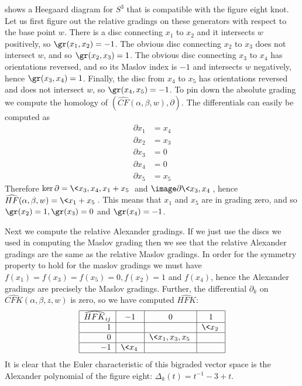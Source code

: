 \begin{example}
 shows a Heegaard diagram for $S^3$ that is compatible with the figure eight knot. Let us first figure out the relative gradings on these generators with respect to the base point $w$. There is a disc connecting $x_1$ to $x_2$ and it intersects $w$ positively, so $\gr(x_1,x_2)=-1$. The obvious disc connecting $x_2$ to $x_3$ does not intersect $w$, and so $\gr(x_2,x_3) = 1$. The obvious disc connecting $x_3$ to $x_4$ has orientations reversed, and so its Maslov index is $-1$ and intersects $w$ negatively, hence $\gr(x_3,x_4) = 1$. Finally, the disc from $x_4$ to $x_5$ has orientations reversed and does not intersect $w$, so $\gr(x_4,x_5)=-1$. To pin down the absolute grading we compute the homology of $(\widehat{CF}(\alpha,\beta,w),\partial)$. The differentials can easily be computed as
\begin{align*}
	\partial x_1 &= x_4 \\
	\partial x_2 &= x_3 \\
	\partial x_3 &= 0 \\
	\partial x_4 &= 0 \\
	\partial x_5 &= x_5 
\end{align*}
Therefore $\ker \partial = \< x_3,x_4,x_1+x_5 \>$ and $\image \partial \< x_3,x_4 \>$, hence $\widehat{HF}(\alpha,\beta,w) = \< x_1+x_5 \>$. This means that $x_1$ and $x_5$ are in grading zero, and so $\gr(x_2)=1,\gr(x_3)=0$ and $\gr(x_4)=-1$. 

Next we compute the relative Alexander gradings. If we just use the discs we used in computing the Maslov grading then we see that the relative Alexander gradings are the same as the relative Maslov gradings. In order for the symmetry property to hold for the maslov gradings we must have $f(x_1)=f(x_3)=f(x_5)=0, f(x_2)=1$ and $f(x_4)$, hence the Alexander gradings are precisely the Maslov gradings. Further, the differential $\partial_k$ on $\widehat{CFK}(\alpha,\beta,z,w)$ is zero, so we have computed $\widehat{HFK}$:
\[
\begin{tabular}{|r|c|c|c|}
\hline
$\widehat{HFK}_{ij}$ & $-1$ & $0$ & $1$ \\
\hline
$1$ & & & $\<x_2\>$ \\
\hline
$0$ & & $\<x_1,x_3,x_5\>$ & \\
\hline
$-1$ & $\<x_4\>$ & & \\
\hline
\end{tabular}
\]
It is clear that the Euler characteristic of this bigraded vector space is the Alexander polynomial of the figure eight: $\Delta_k(t) = t^{-1}-3+t$.
\end{example}








